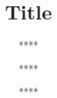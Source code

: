 \documentclass[sigconf]{acmart}
\begin{document}
\title{Title}

\author{****}
\affiliation{%
    \institution{}
    \country{}
}

\author{****}
\affiliation{%
    \institution{}
    \country{}
}

\author{****}
\affiliation{%
    \institution{}
    \country{}
}












\begin{abstract}
    
\end{abstract}
\end{document}
